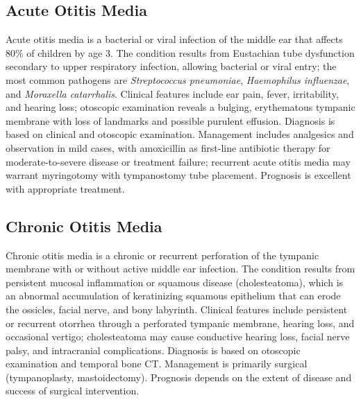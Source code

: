\subsection{Acute Otitis Media}
\label{sec:Acute Otitis Media}
Acute otitis media is a bacterial or viral infection of the middle ear that affects 80\% of children by age 3. The condition results from Eustachian tube dysfunction secondary to upper respiratory infection, allowing bacterial or viral entry; the most common pathogens are \textit{Streptococcus pneumoniae}, \textit{Haemophilus influenzae}, and \textit{Moraxella catarrhalis}. Clinical features include ear pain, fever, irritability, and hearing loss; otoscopic examination reveals a bulging, erythematous tympanic membrane with loss of landmarks and possible purulent effusion. Diagnosis is based on clinical and otoscopic examination. Management includes analgesics and observation in mild cases, with amoxicillin as first-line antibiotic therapy for moderate-to-severe disease or treatment failure; recurrent acute otitis media may warrant myringotomy with tympanostomy tube placement. Prognosis is excellent with appropriate treatment.

\subsection{Chronic Otitis Media}
\label{sec:Chronic Otitis Media}
Chronic otitis media is a chronic or recurrent perforation of the tympanic membrane with or without active middle ear infection. The condition results from persistent mucosal inflammation or squamous disease (cholesteatoma), which is an abnormal accumulation of keratinizing squamous epithelium that can erode the ossicles, facial nerve, and bony labyrinth. Clinical features include persistent or recurrent otorrhea through a perforated tympanic membrane, hearing loss, and occasional vertigo; cholesteatoma may cause conductive hearing loss, facial nerve palsy, and intracranial complications. Diagnosis is based on otoscopic examination and temporal bone CT. Management is primarily surgical (tympanoplasty, mastoidectomy). Prognosis depends on the extent of disease and success of surgical intervention.

